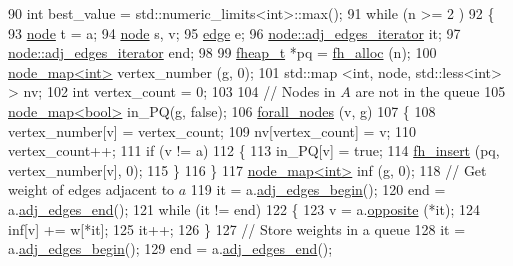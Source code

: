 \begin{DoxyCode}
90     \textcolor{keywordtype}{int} best\_value = std::numeric\_limits<int>::max();
91     \textcolor{keywordflow}{while} (n >= 2 )
92     \{
93         \mbox{\hyperlink{classnode}{node}} t = a;
94         \mbox{\hyperlink{classnode}{node}} s, v;
95         \mbox{\hyperlink{classedge}{edge}} e;
96         \mbox{\hyperlink{classnode_a12cb1a2167f5f03c054de5e707d3156f}{node::adj\_edges\_iterator}} it;
97         \mbox{\hyperlink{classnode_a12cb1a2167f5f03c054de5e707d3156f}{node::adj\_edges\_iterator}} end;
98         
99         \mbox{\hyperlink{structfheap}{fheap\_t}} *pq = \mbox{\hyperlink{fheap_8c_a8a4f7ba67a3d47a511e1af128d59f7cb}{fh\_alloc}} (n);
100         \mbox{\hyperlink{classnode__map}{node\_map<int>}} vertex\_number (\mbox{\hyperlink{rings_8cpp_aa9df5aa3976a89a96a5f1c7611d42938}{g}}, 0);
101         std::map <int, node, std::less<int> > nv;
102         \textcolor{keywordtype}{int} vertex\_count = 0;
103             
104         \textcolor{comment}{// Nodes in $A$ are not in the queue}
105         \mbox{\hyperlink{classnode__map}{node\_map<bool>}} in\_PQ(\mbox{\hyperlink{rings_8cpp_aa9df5aa3976a89a96a5f1c7611d42938}{g}}, \textcolor{keyword}{false});
106         \mbox{\hyperlink{graph_8h_a1905bf4c6aa7167b9ee5a2e72f12ad2d}{forall\_nodes}} (v, \mbox{\hyperlink{rings_8cpp_aa9df5aa3976a89a96a5f1c7611d42938}{g}})
107         \{
108             vertex\_number[v] = vertex\_count;
109             nv[vertex\_count] = v;
110             vertex\_count++;
111             \textcolor{keywordflow}{if} (v != a)
112             \{
113                 in\_PQ[v] = \textcolor{keyword}{true};
114                 \mbox{\hyperlink{fheap_8c_a4489cad6a8830374aaa7db8705d222a1}{fh\_insert}} (pq, vertex\_number[v], 0);   
115             \}
116         \}
117         \mbox{\hyperlink{classnode__map}{node\_map<int>}} inf (\mbox{\hyperlink{rings_8cpp_aa9df5aa3976a89a96a5f1c7611d42938}{g}}, 0); 
118         \textcolor{comment}{// Get weight of edges adjacent to $a$}
119         it = a.\mbox{\hyperlink{classnode_a788d3e932a5c164caa5ec82aa47551b2}{adj\_edges\_begin}}();
120         end = a.\mbox{\hyperlink{classnode_aa1e7887d29390297580769454f769ad6}{adj\_edges\_end}}();
121         \textcolor{keywordflow}{while} (it != end)
122         \{
123             v = a.\mbox{\hyperlink{classnode_a13dbd1809a33a5efede64a359e53a363}{opposite}} (*it);
124             inf[v] += w[*it];   
125             it++;
126         \}
127         \textcolor{comment}{// Store weights in a queue}
128         it = a.\mbox{\hyperlink{classnode_a788d3e932a5c164caa5ec82aa47551b2}{adj\_edges\_begin}}();
129         end = a.\mbox{\hyperlink{classnode_aa1e7887d29390297580769454f769ad6}{adj\_edges\_end}}();

\end{DoxyCode}
